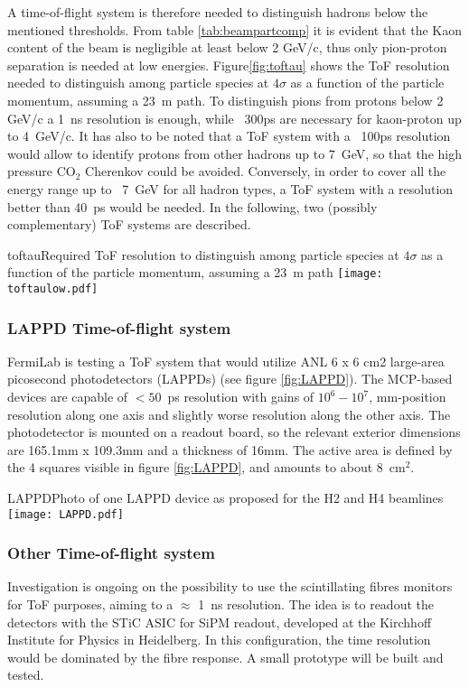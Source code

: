 A time-of-flight system  is therefore needed to distinguish hadrons below the mentioned thresholds.  From table \ref{tab:beampartcomp} it is evident that the Kaon content of the beam is negligible at least below 2 GeV/c, thus  only pion-proton separation is needed at low energies. Figure\ref{fig:toftau} shows the ToF resolution needed to distinguish among particle species at $4\sigma$ as a function of the particle momentum, assuming a 23~m path. To distinguish pions from protons below 2 GeV/c a 1~ns resolution is enough, while ~300ps are necessary for kaon-proton up to  4~GeV/c. It has also to be noted that a ToF system with a ~100ps resolution would allow to identify protons from other hadrons up to 7~GeV, so that the high pressure CO$_2$ Cherenkov could be avoided. Conversely, in order to cover all the energy range up to ~7~GeV for all hadron  types, a ToF system with a resolution better than 40~ps would be needed.
In the following, two (possibly complementary) ToF systems are described.
\begin{cdrfigure}{toftau}{Required ToF resolution to  distinguish among particle species at $4\sigma$ as a function of the particle momentum, assuming a 23~m path }
\texttt{[image: toftaulow.pdf]}
\end{cdrfigure}

\subsubsection{LAPPD Time-of-flight system}
FermiLab is testing a ToF system that would utilize ANL 6 x 6 cm2
large-area picosecond photodetectors (LAPPDs) (see figure \ref{fig:LAPPD}).
 The MCP-based devices
are capable of $< 50$~ps resolution with gains of $10^6-10^7$,
mm-position resolution along one axis and slightly worse resolution
along the other axis.  The photodetector is mounted on a readout
board, so the relevant exterior dimensions are 165.1mm x 109.3mm and a
thickness of 16mm. The active area is defined by the 4 squares visible in figure \ref{fig:LAPPD}, and amounts to about 8~cm$^2$.
\begin{cdrfigure}[LAPPD]{LAPPD}{Photo of one LAPPD device as proposed for the H2 and H4 beamlines}
\texttt{[image: LAPPD.pdf]}
\end{cdrfigure}

\subsubsection{Other Time-of-flight system}
Investigation is ongoing on the possibility  to use the  scintillating fibres monitors for ToF purposes, aiming to a $\approx $ 1~ns resolution. The idea is to readout the detectors with the STiC ASIC for SiPM readout, developed at the  Kirchhoff Institute for Physics in Heidelberg. In this configuration, the time resolution would be dominated by the fibre response. A small prototype will be built and tested.
